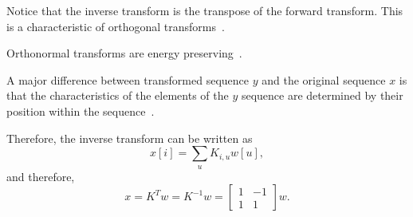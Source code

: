 Notice that the inverse transform is the transpose of the forward transform. This is a characteristic of orthogonal transforms~\cite{sayood2017introduction}.

Orthonormal transforms are energy preserving~\cite{sayood2017introduction}.

A major difference between transformed sequence $y$ and the original
sequence $x$ is that the characteristics of the elements of the $y$
sequence are determined by their position within the
sequence~\cite{sayood2017introduction}.

Therefore, the inverse transform can be written as
\begin{equation}
  x[i] = \sum_u K_{i,u}w[u],
  \label{eq:inverse_transform_linear_combination_form}
\end{equation}
and therefore,
\begin{equation}
  x = K^Tw = K^{-1}w = \begin{bmatrix} 1 & -1 \\ 1 & 1 \end{bmatrix}w.
  \label{eq:inverse_transform_matrix_form}
\end{equation}

